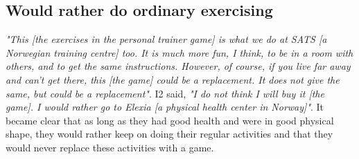 \subsection{Would rather do ordinary exercising}
\emph{"This [the exercises in the personal trainer game] is what we do at SATS [a Norwegian training centre] too. It is much more fun, I think, to be in a room with others, and to get the same instructions. However, of course, if you live far away and can't get there, this [the game] could be a replacement. It does not give the same, but could be a replacement"}. I2 said, \emph{"I do not think I will buy it [the game]. I would rather go to Elexia [a physical health center in Norway]"}. It became clear that as long as they had good health and were in good physical shape, they would rather keep on doing their regular activities and that they would never replace these activities with a game. 



